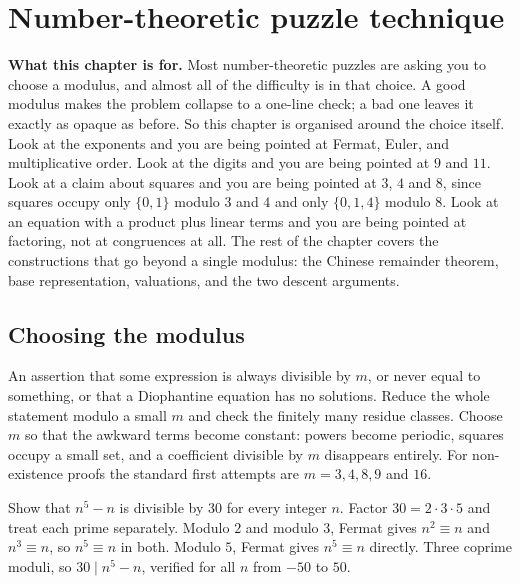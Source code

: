 \chapter{Number-theoretic puzzle technique}

\begin{orient}
\textbf{What this chapter is for.} Most number-theoretic puzzles are asking you to choose a modulus, and almost all of the difficulty is in that choice. A good modulus makes the problem collapse to a one-line check; a bad one leaves it exactly as opaque as before. So this chapter is organised around the choice itself. Look at the exponents and you are being pointed at Fermat, Euler, and multiplicative order. Look at the digits and you are being pointed at $9$ and $11$. Look at a claim about squares and you are being pointed at $3$, $4$ and $8$, since squares occupy only $\{0,1\}$ modulo $3$ and $4$ and only $\{0,1,4\}$ modulo $8$. Look at an equation with a product plus linear terms and you are being pointed at factoring, not at congruences at all. The rest of the chapter covers the constructions that go beyond a single modulus: the Chinese remainder theorem, base representation, valuations, and the two descent arguments.
\end{orient}

\section{Choosing the modulus}

\cue An assertion that some expression is always divisible by $m$, or never equal to something, or that a Diophantine equation has no solutions.
\method Reduce the whole statement modulo a small $m$ and check the finitely many residue classes. Choose $m$ so that the awkward terms become constant: powers become periodic, squares occupy a small set, and a coefficient divisible by $m$ disappears entirely. For non-existence proofs the standard first attempts are $m=3,4,8,9$ and $16$.

\begin{worked}
Show that $n^{5}-n$ is divisible by $30$ for every integer $n$. Factor $30=2\cdot3\cdot5$ and treat each prime separately. Modulo $2$ and modulo $3$, Fermat gives $n^{2}\equiv n$ and $n^{3}\equiv n$, so $n^{5}\equiv n$ in both. Modulo $5$, Fermat gives $n^{5}\equiv n$ directly. Three coprime moduli, so $30\mid n^{5}-n$, verified for all $n$ from $-50$ to $50$.
\end{worked}

